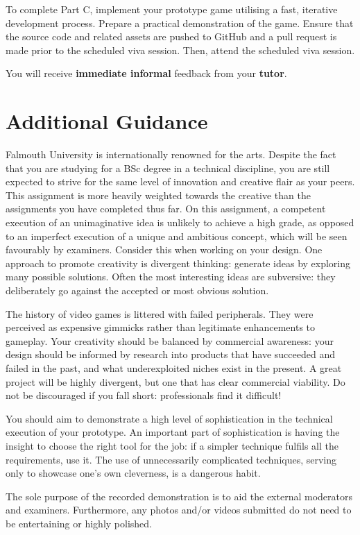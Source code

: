 \documentclass{../fal_assignment}
\begin{document}
	To complete Part C, implement your prototype game utilising a fast, iterative development process. Prepare a practical demonstration of the game. Ensure that the source code and related assets are pushed to GitHub and a pull request is made prior to the scheduled viva session. Then, attend the scheduled viva session. 
	
	You will receive \textbf{immediate informal} feedback from your \textbf{tutor}.
	
	\section*{Additional Guidance}
	Falmouth University is internationally renowned for the arts. Despite the fact that you are studying for a BSc degree in a technical discipline, you are still expected to strive for the same level of innovation and creative flair as your peers. This assignment is more heavily weighted towards the creative than the assignments you have completed thus far. On this assignment, a competent execution of an unimaginative idea is unlikely to achieve a high grade, as opposed to an imperfect execution of a unique and ambitious concept, which will be seen favourably by examiners. Consider this when working on your design. One approach to promote creativity is divergent thinking: generate ideas by exploring many possible solutions. Often the most interesting ideas are subversive: they deliberately go against the accepted or most obvious solution.
	
	The history of video games is littered with failed peripherals. They were perceived as expensive gimmicks rather than legitimate enhancements to gameplay. Your creativity should be balanced by commercial awareness: your design should be informed by research into products that have succeeded and failed in the past, and what underexploited niches exist in the present. A great project will be highly divergent, but one that has clear commercial viability. Do not be discouraged if you fall short: professionals find it difficult! 
	
	You should aim to demonstrate a high level of sophistication in the technical execution of your prototype. An important part of sophistication is having the insight to choose the right tool for the job: if a simpler technique fulfils all the requirements, use it. The use of unnecessarily complicated techniques, serving only to showcase one's own cleverness, is a dangerous habit. 
	
	The sole purpose of the recorded demonstration is to aid the external moderators and examiners. Furthermore, any photos and/or videos submitted do not need to be entertaining or highly polished.
	
\end{document}
